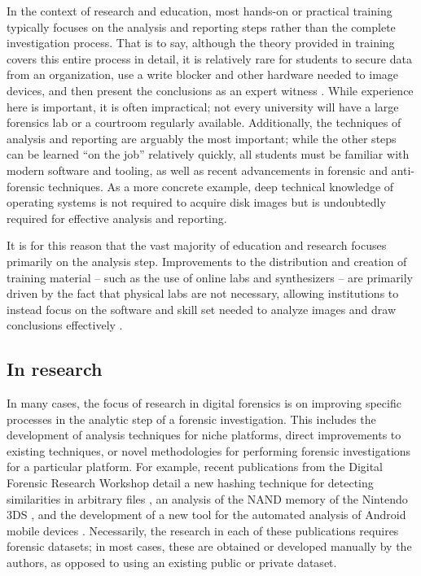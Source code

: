 \documentclass[letterpaper,12pt]{report}
\begin{document}
In the context of research and education, most hands-on or practical
training typically focuses on the analysis and reporting steps rather
than the complete investigation process. That is to say, although the
theory provided in training covers this entire process in detail, it is
relatively rare for students to secure data from an organization, use a
write blocker and other hardware needed to image devices, and then
present the conclusions as an expert witness
\cite{cooperStandardsDigitalForensics2010}. While experience here is
important, it is often impractical; not every university will have a
large forensics lab or a courtroom regularly available. Additionally,
the techniques of analysis and reporting are arguably the most
important; while the other steps can be learned ``on the job''
relatively quickly, all students must be familiar with modern software
and tooling, as well as recent advancements in forensic and
anti-forensic techniques. As a more concrete example, deep technical
knowledge of operating systems is not required to acquire disk images
but is undoubtedly required for effective analysis and reporting.

It is for this reason that the vast majority of education and research
focuses primarily on the analysis step. Improvements to the distribution
and creation of training material -- such as the use of online labs and
synthesizers -- are primarily driven by the fact that physical labs are
not necessary, allowing institutions to instead focus on the software
and skill set needed to analyze images and draw conclusions effectively
\cite{bruecknerAutomatedComputerForensics2008,lawrenceFrameworkDesignWebbased2009}.

\subsection{In research}\label{in-research}

In many cases, the focus of research in digital forensics is on
improving specific processes in the analytic step of a forensic
investigation. This includes the development of analysis techniques for
niche platforms, direct improvements to existing techniques, or novel
methodologies for performing forensic investigations for a particular
platform. For example, recent publications from the Digital Forensic
Research Workshop detail a new hashing technique for detecting
similarities in arbitrary files \cite{changFbHashNewSimilarity2019},
an analysis of the NAND memory of the Nintendo 3DS
\cite{pessolanoForensicAnalysisNintendo2019}, and the development of
a new tool for the automated analysis of Android mobile devices
\cite{linAutomatedForensicAnalysis2018}. Necessarily, the research
in each of these publications requires forensic datasets; in most cases,
these are obtained or developed manually by the authors, as opposed to
using an existing public or private dataset.
\end{document}
